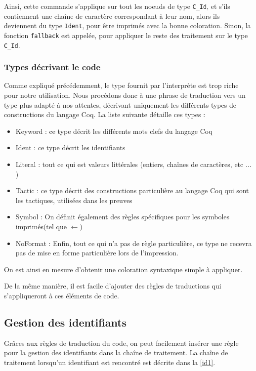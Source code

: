 \documentclass[a4paper, 11pt]{report}
\begin{document}
    Ainsi, cette commande s'applique sur tout les noeuds de type \texttt{C\_Id},
    et s'ils contiennent une chaîne de caractère correspondant à leur nom, alors
    ils deviennent du type \texttt{Ident}, pour être imprimés avec la bonne
    coloration.  Sinon, la fonction \texttt{fallback} est appelée, pour
    appliquer le reste des traitement sur le type \texttt{C\_Id}.
    \subsubsection{Types décrivant le code}
    Comme expliqué précédemment, le type fournit par l'interprète est trop riche
    pour notre utilisation. Nous procédons donc à une phrase de traduction vers
    un type plus adapté à nos attentes, décrivant uniquement les différents types
    de constructions du langage Coq. La liste suivante détaille ces types :
    \begin{itemize}
      \item Keyword : ce type décrit les différents mots clefs du langage Coq
      \item Ident : ce type décrit les identifiants
      \item Literal : tout ce qui est valeurs littérales (entiers, chaînes de
        caractères, etc $\ldots$)
      \item Tactic : ce type décrit des constructions particulière au langage
        Coq qui sont les tactiques, utilisées dans les preuves
      \item Symbol : On définit également des règles spécifiques pour les symboles
        imprimés(tel que $\leftarrow$)
      \item NoFormat : Enfin, tout ce qui n'a pas de règle particulière, ce type
        ne recevra pas de mise en forme particulière lors de l'impression.
    \end{itemize}
    On est ainsi en mesure d'obtenir une coloration syntaxique simple à
    appliquer.

    De la même manière, il est facile d'ajouter des règles de traductions
    qui s'appliqueront à ces éléments de code.

    \subsection{Gestion des identifiants}
    Grâces aux règles de traduction du code, on peut facilement insérer une
    règle pour la gestion des identifiants dans la chaîne de traitement.
    La chaîne de traitement lorsqu'un identifiant est rencontré est décrite
    dans la \cref{id1}.
\end{document}
